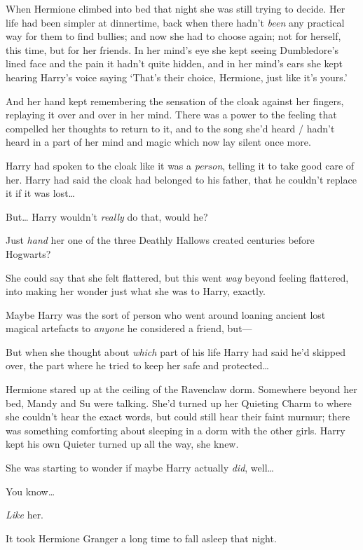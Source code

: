 When Hermione climbed into bed that night she was still trying to
decide. Her life had been simpler at dinnertime, back when there hadn't
\emph{been} any practical way for them to find bullies; and now she had
to choose again; not for herself, this time, but for her friends. In her
mind's eye she kept seeing Dumbledore's lined face and the pain it
hadn't quite hidden, and in her mind's ears she kept hearing Harry's
voice saying `That's their choice, Hermione, just like it's yours.'

And her hand kept remembering the sensation of the cloak against her
fingers, replaying it over and over in her mind. There was a power to
the feeling that compelled her thoughts to return to it, and to the song
she'd heard / hadn't heard in a part of her mind and magic which now lay
silent once more.

Harry had spoken to the cloak like it was a \emph{person}, telling it to
take good care of her. Harry had said the cloak had belonged to his
father, that he couldn't replace it if it was lost\ldots{}

But\ldots{} Harry wouldn't \emph{really} do that, would he?

Just \emph{hand} her one of the three Deathly Hallows created centuries
before Hogwarts?

She could say that she felt flattered, but this went \emph{way} beyond
feeling flattered, into making her wonder just what she was to Harry,
exactly.

Maybe Harry was the sort of person who went around loaning ancient lost
magical artefacts to \emph{anyone} he considered a friend, but---

But when she thought about \emph{which} part of his life Harry had said
he'd skipped over, the part where he tried to keep her safe and
protected\ldots{}

Hermione stared up at the ceiling of the Ravenclaw dorm. Somewhere
beyond her bed, Mandy and Su were talking. She'd turned up her Quieting
Charm to where she couldn't hear the exact words, but could still hear
their faint murmur; there was something comforting about sleeping in a
dorm with the other girls. Harry kept his own Quieter turned up all the
way, she knew.

She was starting to wonder if maybe Harry actually \emph{did},
well\ldots{}

You know\ldots{}

\emph{Like} her.

It took Hermione Granger a long time to fall asleep that night.

